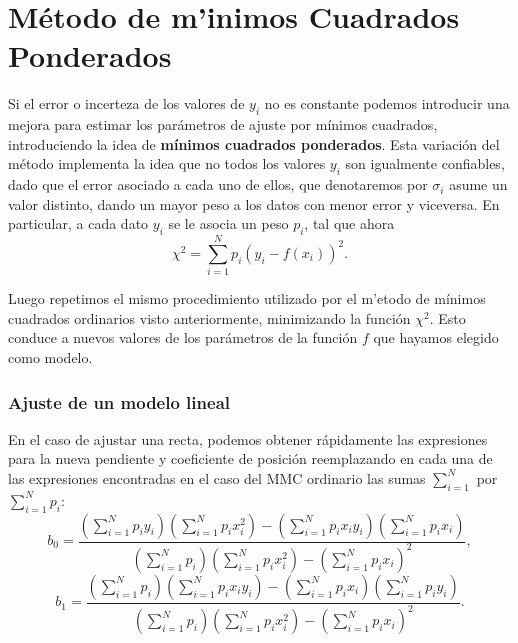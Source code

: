 \documentclass[letterpaper,11pt]{report}
\begin{document}
\section{Método de m'inimos Cuadrados Ponderados}

Si el error o incerteza de los valores de $y_i$ no es constante podemos introducir una mejora para estimar los parámetros de ajuste por mínimos cuadrados, introduciendo la idea de \textbf{mínimos cuadrados ponderados}. Esta variación del método implementa la idea que no todos los valores $y_{i}$ son igualmente confiables, dado que el error asociado a cada uno de ellos, que denotaremos por $\sigma_i$ asume un valor distinto, dando un mayor peso a los datos con menor error y viceversa. En particular, a cada dato $y_i$ se le asocia un peso $p_{i}$, tal que ahora
\begin{equation}
\chi^2=\sum_{i=1}^N p_i\left(y_i-f(x_i)\right)^2.
\end{equation}

Luego repetimos el mismo procedimiento utilizado por el m'etodo de mínimos cuadrados ordinarios visto anteriormente, minimizando la función $\chi^2$. Esto conduce a nuevos valores de los parámetros de la función $f$ que hayamos elegido como modelo. 

\subsubsection{Ajuste de un modelo lineal}
En el caso de ajustar una recta, podemos obtener rápidamente las expresiones para la nueva pendiente y coeficiente de posición reemplazando en cada una de las expresiones encontradas en el caso del MMC ordinario las sumas $\sum_{i=1}^N$ por $\sum_{i=1}^Np_{i}$:
\begin{equation}\label{b0MMCP}
b_0 = \frac{\left(\sum_{i=1}^N p_{i}y_{i}\right)\left(\sum_{i=1}^N p_{i}x_{i}^2\right)-\left(\sum_{i=1}^N p_{i}x_{i} y_{i}\right)\left(\sum_{i=1}^N p_{i}x_{i}\right)}
{\left(\sum_{i=1}^N p_{i}\right)\left(\sum_{i=1}^N p_{i}x_{i}^{2}\right)-\left(\sum_{i=1}^N p_{i}x_{i}\right)^{2}},
\end{equation}
\begin{equation}\label{b1MMCP}
b_1 =  \frac{\left(\sum_{i=1}^N p_{i}\right)\left(\sum_{i=1}^N p_{i}x_{i} y_{i}\right)-\left(\sum_{i=1}^N p_{i}x_{i}\right)\left(\sum_{i=1}^N p_{i}y_{i}\right)}
{\left(\sum_{i=1}^N p_{i}\right)\left(\sum_{i=1}^N p_{i}x_{i}^{2}\right)-\left(\sum_{i=1}^N p_{i}x_{i}\right)^{2}}. 
\end{equation}
\end{document}

